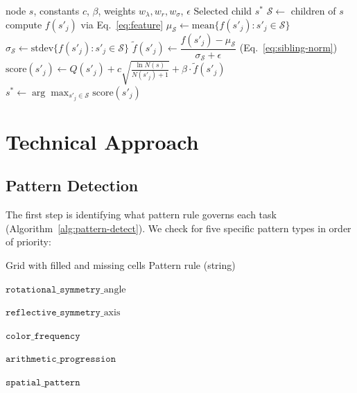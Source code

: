 \documentclass[11pt]{article}
\begin{document}
\begin{algorithm}[h]
\caption{SelectChildWithTopoUCB}
\label{alg:select}
\begin{algorithmic}[1]
\Require node $s$, constants $c$, $\beta$, weights $w_\lambda, w_r, w_\sigma$, $\epsilon$
\Ensure Selected child $s^*$
\State $\mathcal{S} \gets$ children of $s$
  \State compute $f(s'_j)$ via Eq.~\eqref{eq:feature}
\EndFor
\State $\mu_{\mathcal{S}} \gets \mathrm{mean}\{f(s'_j) : s'_j \in \mathcal{S}\}$
\State $\sigma_{\mathcal{S}} \gets \mathrm{stdev}\{f(s'_j) : s'_j \in \mathcal{S}\}$
  \State $\widetilde{f}(s'_j) \gets \dfrac{f(s'_j) - \mu_{\mathcal{S}}}{\sigma_{\mathcal{S}} + \epsilon}$ \quad (Eq.~\eqref{eq:sibling-norm})
  \State $\mathrm{score}(s'_j) \gets Q(s'_j) + c\sqrt{\frac{\ln N(s)}{N(s'_j) + 1}} + \beta \cdot \widetilde{f}(s'_j)$
\EndFor
\State \Return $s^* \gets \arg\max_{s'_j \in \mathcal{S}} \mathrm{score}(s'_j)$
\end{algorithmic}
\end{algorithm}

\section{Technical Approach}

\subsection{Pattern Detection}

The first step is identifying what pattern rule governs each task (Algorithm~\ref{alg:pattern-detect}). We check for five specific pattern types in order of priority:

\begin{algorithm}[h]
\caption{Pattern Detection}
\label{alg:pattern-detect}
\begin{algorithmic}[1]
\Require Grid with filled and missing cells
\Ensure Pattern rule (string)

    \State \Return $\texttt{rotational\_symmetry\_}\text{angle}$
  \EndIf
\EndFor

    \State \Return $\texttt{reflective\_symmetry\_}\text{axis}$
  \EndIf
\EndFor

  \State \Return $\texttt{color\_frequency}$
\EndIf

  \State \Return $\texttt{arithmetic\_progression}$
\EndIf

\State \Return $\texttt{spatial\_pattern}$
\end{algorithmic}
\end{algorithm}
\end{document}
